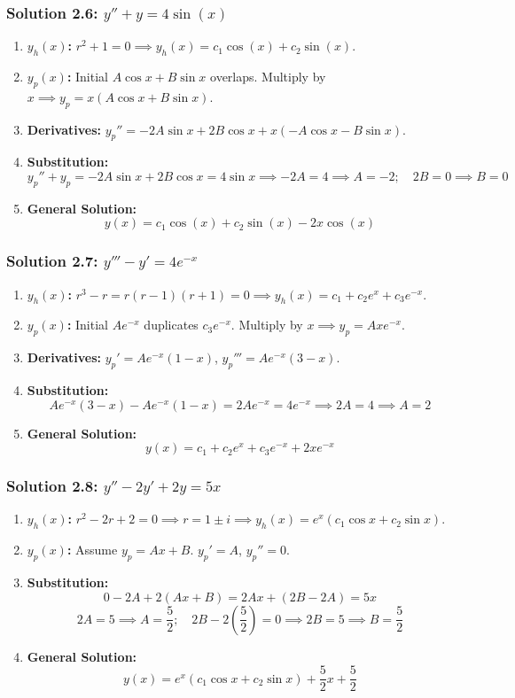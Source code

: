 \documentclass[11pt,letterpaper]{article}
\begin{document}
\subsubsection*{Solution 2.6: $y'' + y = 4\sin(x)$}
\begin{enumerate}
    \item \textbf{$y_h(x)$:} $r^2 + 1 = 0 \implies y_h(x) = c_1 \cos(x) + c_2 \sin(x)$.
    \item \textbf{$y_p(x)$:} Initial $A \cos x + B \sin x$ overlaps. Multiply by $x \implies y_p = x(A \cos x + B \sin x)$.
    \item \textbf{Derivatives:} $y_p'' = -2A \sin x + 2B \cos x + x(-A \cos x - B \sin x)$.
    \item \textbf{Substitution:}
    \[ y_p'' + y_p = -2A \sin x + 2B \cos x = 4\sin x \implies -2A = 4 \implies A = -2; \quad 2B = 0 \implies B = 0 \]
    \item \textbf{General Solution:}
    \[ y(x) = c_1 \cos(x) + c_2 \sin(x) - 2x \cos(x) \]
\end{enumerate}

\subsubsection*{Solution 2.7: $y''' - y' = 4e^{-x}$}
\begin{enumerate}
    \item \textbf{$y_h(x)$:} $r^3 - r = r(r-1)(r+1) = 0 \implies y_h(x) = c_1 + c_2 e^x + c_3 e^{-x}$.
    \item \textbf{$y_p(x)$:} Initial $A e^{-x}$ duplicates $c_3 e^{-x}$. Multiply by $x \implies y_p = A x e^{-x}$.
    \item \textbf{Derivatives:} $y_p' = A e^{-x}(1 - x)$, $y_p''' = A e^{-x}(3 - x)$.
    \item \textbf{Substitution:}
    \[ A e^{-x}(3 - x) - A e^{-x}(1 - x) = 2A e^{-x} = 4 e^{-x} \implies 2A = 4 \implies A = 2 \]
    \item \textbf{General Solution:}
    \[ y(x) = c_1 + c_2 e^x + c_3 e^{-x} + 2x e^{-x} \]
\end{enumerate}

\subsubsection*{Solution 2.8: $y'' - 2y' + 2y = 5x$}
\begin{enumerate}
    \item \textbf{$y_h(x)$:} $r^2 - 2r + 2 = 0 \implies r = 1 \pm i \implies y_h(x) = e^x(c_1 \cos x + c_2 \sin x)$.
    \item \textbf{$y_p(x)$:} Assume $y_p = A x + B$. $y_p' = A$, $y_p'' = 0$.
    \item \textbf{Substitution:}
    \[ 0 - 2A + 2(Ax + B) = 2Ax + (2B - 2A) = 5x \]
    \[ 2A = 5 \implies A = \frac{5}{2}; \quad 2B - 2\left(\frac{5}{2}\right) = 0 \implies 2B = 5 \implies B = \frac{5}{2} \]
    \item \textbf{General Solution:}
    \[ y(x) = e^x(c_1 \cos x + c_2 \sin x) + \frac{5}{2}x + \frac{5}{2} \]
\end{enumerate}
\end{document}
